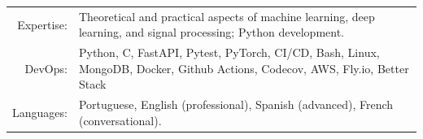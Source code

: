 \documentclass[a4paper,11pt]{article}
\begin{document}
    \begin{tabular}{rp{13cm}}
  	Expertise:  & Theoretical and practical aspects of machine learning, deep learning, and signal processing; Python development.
    \vspace{5pt}\\
    DevOps:  &  Python, C, FastAPI, Pytest, PyTorch, CI/CD, Bash, Linux, MongoDB, Docker, Github Actions, Codecov, AWS, Fly.io, Better Stack \vspace{5pt}\\
    Languages: & Portuguese, English (professional), Spanish (advanced), French (conversational).
    \end{tabular}




      
\end{document}
